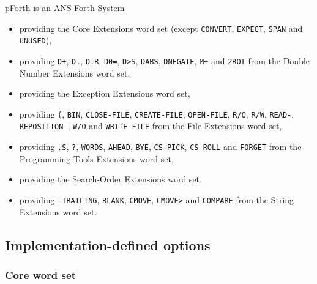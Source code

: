 \documentclass[english]{article}
\begin{document}
pForth is an ANS Forth System
\vspace{-3mm}
\begin{itemize}
\item[]providing the Core Extensions word set (except {\tt CONVERT}, {\tt EXPECT}, {\tt SPAN} and {\tt UNUSED}),
\item[]providing {\tt D+}, {\tt D.}, {\tt D.R}, {\tt D0=}, {\tt D>S}, {\tt DABS}, {\tt DNEGATE}, {\tt M+} and {\tt 2ROT} from the Double-Number Extensions word set,
\item[]providing the Exception Extensions word set,
\item[]providing {\tt (}, {\tt BIN}, {\tt CLOSE-FILE}, {\tt CREATE-FILE}, {\tt OPEN-FILE}, {\tt R/O}, {\tt R/W}, {\tt READ-}, {\tt REPOSITION-}, {\tt W/O} and {\tt WRITE-FILE} from the File Extensions word set,
\item[]providing {\tt .S}, {\tt ?}, {\tt WORDS}, {\tt AHEAD}, {\tt BYE}, {\tt CS-PICK}, {\tt CS-ROLL} and {\tt FORGET} from the Programming-Tools Extensions word set,
\item[]providing the Search-Order Extensions word set,
\item[]providing {\tt -TRAILING}, {\tt BLANK}, {\tt CMOVE}, {\tt CMOVE>} and {\tt COMPARE} from the String Extensions word set.
\end{itemize}


\subsection{Implementation-defined options}

\subsubsection{Core word set}
\end{document}
